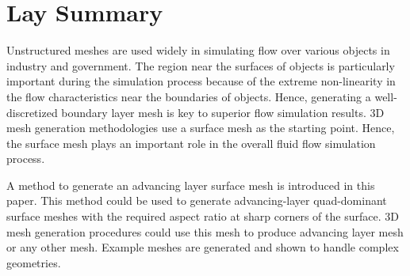 

\chapter{Lay Summary}

Unstructured meshes are used widely in simulating flow over various objects in industry and government. The region near the surfaces of objects is particularly important during the simulation process because of the extreme non-linearity in the flow characteristics near the boundaries of objects. Hence, generating a well-discretized boundary layer mesh is key to superior flow simulation results. 3D mesh generation methodologies use a surface mesh as the starting point. Hence, the surface mesh plays an important role in the overall fluid flow simulation process.

A method to generate an advancing layer surface mesh is introduced in this paper. This method could be used to generate advancing-layer quad-dominant surface meshes with the required aspect ratio at sharp corners of the surface. 3D mesh generation procedures could use this mesh to produce advancing layer mesh or any other mesh. Example meshes are generated and shown to handle complex geometries.

